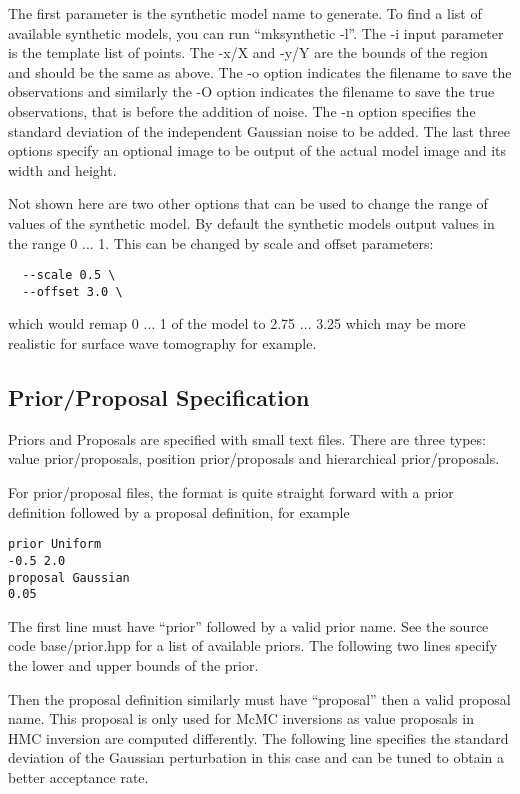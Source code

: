 \documentclass[a4paper,12pt]{article}
\begin{document}
The first parameter is the synthetic model name to generate. To find a
list of available synthetic models, you can run ``mksynthetic
-l''. The -i input parameter is the template list of points. The -x/X
and -y/Y are the bounds of the region and should be the same as
above. The -o option indicates the filename to save the observations
and similarly the -O option indicates the filename to save the true
observations, that is before the addition of noise. The -n option
specifies the standard deviation of the independent Gaussian noise to
be added. The last three options specify an optional image to be
output of the actual model image and its width and height.

Not shown here are two other options that can be used to change the
range of values of the synthetic model. By default the synthetic
models output values in the range 0 $\ldots$ 1. This can be changed by
scale and offset parameters:

\begin{verbatim}
  --scale 0.5 \
  --offset 3.0 \
\end{verbatim}

which would remap 0 $\ldots$ 1 of the model to 2.75 $\ldots$ 3.25 which may be more
realistic for surface wave tomography for example.

\subsection{Prior/Proposal Specification}

Priors and Proposals are specified with small text files. There are three
types: value prior/proposals, position prior/proposals and hierarchical
prior/proposals.

For prior/proposal files, the format is quite straight forward with
a prior definition followed by a proposal definition, for example

\begin{verbatim}
prior Uniform
-0.5 2.0
proposal Gaussian
0.05
\end{verbatim}

The first line must have ``prior'' followed by a valid prior name. See
the source code base/prior.hpp for a list of available priors. The
following two lines specify the lower and upper bounds of the prior.

Then the proposal definition similarly must have ``proposal'' then a
valid proposal name. This proposal is only used for McMC inversions as
value proposals in HMC inversion are computed differently. The
following line specifies the standard deviation of the Gaussian
perturbation in this case and can be tuned to obtain a better
acceptance rate.
\end{document}
